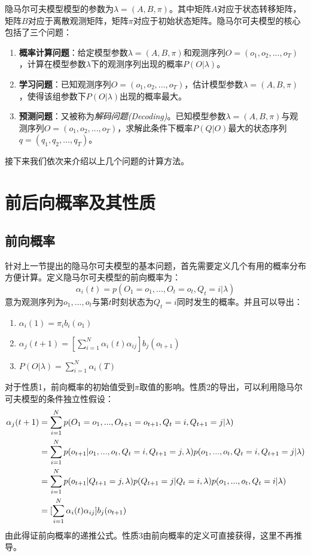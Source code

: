 \documentclass[UTF8, 12pt]{ctexart}
\begin{document}
	隐马尔可夫模型模型的参数为$\lambda =(A,B,\pi)$。其中矩阵$A$对应于状态转移矩阵，矩阵$B$对应于离散观测矩阵，矩阵$\pi$对应于初始状态矩阵。隐马尔可夫模型的核心包括了三个问题\cite{李航2012统计学习方法}：
	\begin{enumerate}
		\item \textbf{概率计算问题}：给定模型参数$\lambda =(A,B,\pi)$和观测序列$O=(o_{1}, o_{2},..., o_{T})$，计算在模型参数$\lambda$下的观测序列出现的概率$P(O|\lambda)$。
		\item \textbf{学习问题}：已知观测序列$O=(o_{1}, o_{2},..., o_{T})$，估计模型参数$\lambda = (A, B, \pi)$，使得该组参数下$P(O|\lambda)$出现的概率最大。
		\item \textbf{预测问题}：又被称为\emph{解码问题(Decoding)}。已知模型参数$\lambda = (A, B, \pi)$与观测序列$O=(o_{1}, o_{2},..., o_{T})$，求解此条件下概率$P(Q|O)$最大的状态序列$q=(q_{1}, q_{2}, ..., q_{T})$。
	\end{enumerate}
	接下来我们依次来介绍以上几个问题的计算方法。

\section{前后向概率及其性质}

	\subsection{前向概率}
	针对上一节提出的隐马尔可夫模型的基本问题，首先需要定义几个有用的概率分布方便计算。定义隐马尔可夫模型的前向概率为：
	\begin{equation}
		\alpha_{i}(t) = p(O_{1}=o_{1}, ..., O_{t}=o_{t}, Q_{t}=i|\lambda)
	\end{equation}
	意为观测序列为$o_{1}, ..., o_{t}$与第$t$时刻状态为$Q_{t}=i$同时发生的概率。并且可以导出：
	\begin{enumerate}
		\item $\alpha_{i}(1) = \pi_{i}b_{i}(o_{1})$
		\item $\alpha_{j}(t+1)=[ \sum\limits_{i = 1}^N {{\alpha _i}(t){\alpha _{ij}}} ]b_{j}(o_{t+1})$
		\item $P(O|\lambda)=\sum\limits_{i = 1}^N {{\alpha _i}(T)}$
	\end{enumerate}
	对于性质1，前向概率的初始值受到$\pi$取值的影响。性质2的导出，可以利用隐马尔可夫模型的条件独立性假设：
	\begin{align}
		\alpha_{j}(t+1) & = \sum \limits_{i=1}^{N} {p(O_{1}=o_{1}, ..., O_{t+1}=o_{t+1}, Q_{t}=i, Q_{t+1}=j|\lambda)} \notag \\
						& = \sum \limits_{i=1}^{N} {p(o_{t+1}|o_{1}, ..., o_{t}, Q_{t}=i, Q_{t+1}=j, \lambda)p(o_{1},...,o_{t}, Q_{t}=i, Q_{t+1}=j|\lambda)} \\
						& = \sum \limits_{i=1}^{N} {p(o_{t+1}|Q_{t+1}=j, \lambda)p(Q_{t+1}=j|Q_{t}=i, \lambda)p(o_{1}, ..., o_{t}, Q_{t}=i|\lambda)} \\
						& = [ \sum\limits_{i = 1}^N {{\alpha _i}(t){\alpha _{ij}}} ]b_{j}(o_{t+1})
	\end{align}
	由此得证前向概率的递推公式。性质3由前向概率的定义可直接获得，这里不再推导。
	
\end{document}
